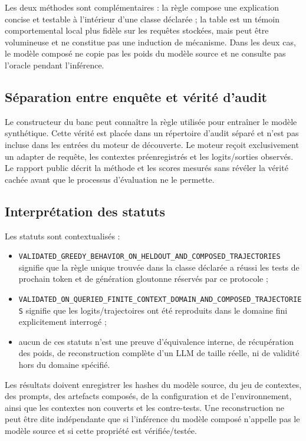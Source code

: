 \documentclass[11pt,a4paper]{article}
\begin{document}
Les deux méthodes sont complémentaires : la règle compose une explication concise et testable à l'intérieur d'une classe déclarée ; la table est un témoin comportemental local plus fidèle sur les requêtes stockées, mais peut être volumineuse et ne constitue pas une induction de mécanisme. Dans les deux cas, le modèle composé ne copie pas les poids du modèle source et ne consulte pas l'oracle pendant l'inférence.

\subsection{Séparation entre enquête et vérité d'audit}
Le constructeur du banc peut connaître la règle utilisée pour entraîner le modèle synthétique. Cette vérité est placée dans un répertoire d'audit séparé et n'est pas incluse dans les entrées du moteur de découverte. Le moteur reçoit exclusivement un adapter de requête, les contextes préenregistrés et les logits/sorties observés. Le rapport public décrit la méthode et les scores mesurés sans révéler la vérité cachée avant que le processus d'évaluation ne le permette.

\subsection{Interprétation des statuts}
Les statuts sont contextualisés :
\begin{itemize}
\item \texttt{VALIDATED\_GREEDY\_BEHAVIOR\_ON\_HELDOUT\_AND\_COMPOSED\_TRAJECTORIES} signifie que la règle unique trouvée dans la classe déclarée a réussi les tests de prochain token et de génération gloutonne réservés par ce protocole ;
\item \texttt{VALIDATED\_ON\_QUERIED\_FINITE\_CONTEXT\_DOMAIN\_AND\_COMPOSED\_TRAJECTORIES} signifie que les logits/trajectoires ont été reproduits dans le domaine fini explicitement interrogé ;
\item aucun de ces statuts n'est une preuve d'équivalence interne, de récupération des poids, de reconstruction complète d'un LLM de taille réelle, ni de validité hors du domaine spécifié.
\end{itemize}
Les résultats doivent enregistrer les hashes du modèle source, du jeu de contextes, des prompts, des artefacts composés, de la configuration et de l'environnement, ainsi que les contextes non couverts et les contre-tests. Une reconstruction ne peut être dite indépendante que si l'inférence du modèle composé n'appelle pas le modèle source et si cette propriété est vérifiée/testée.
\end{document}
